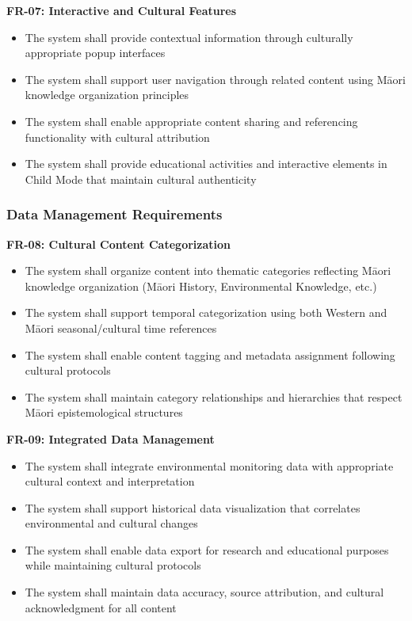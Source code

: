 \textbf{FR-07: Interactive and Cultural Features}
\begin{itemize}
    \item The system shall provide contextual information through culturally appropriate popup interfaces
    \item The system shall support user navigation through related content using M\=aori knowledge organization principles
    \item The system shall enable appropriate content sharing and referencing functionality with cultural attribution
    \item The system shall provide educational activities and interactive elements in Child Mode that maintain cultural authenticity
\end{itemize}

\subsubsection{Data Management Requirements}
\label{subsubsec:data_management}

\textbf{FR-08: Cultural Content Categorization}
\begin{itemize}
    \item The system shall organize content into thematic categories reflecting M\=aori knowledge organization (M\=aori History, Environmental Knowledge, etc.)
    \item The system shall support temporal categorization using both Western and M\=aori seasonal/cultural time references
    \item The system shall enable content tagging and metadata assignment following cultural protocols
    \item The system shall maintain category relationships and hierarchies that respect M\=aori epistemological structures
\end{itemize}

\textbf{FR-09: Integrated Data Management}
\begin{itemize}
    \item The system shall integrate environmental monitoring data with appropriate cultural context and interpretation
    \item The system shall support historical data visualization that correlates environmental and cultural changes
    \item The system shall enable data export for research and educational purposes while maintaining cultural protocols
    \item The system shall maintain data accuracy, source attribution, and cultural acknowledgment for all content
\end{itemize}

